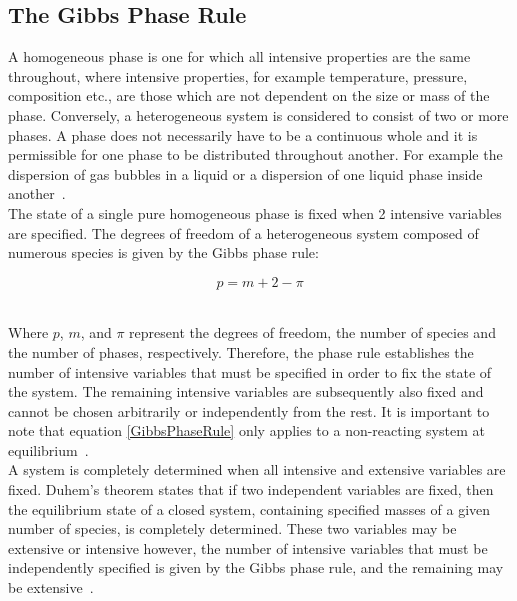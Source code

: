 \subsection{The Gibbs Phase Rule}

A homogeneous phase is one for which all intensive properties are the same throughout, where intensive properties, for example temperature, pressure, composition etc.,  are those which are not dependent on the size or mass of the phase. Conversely, a heterogeneous system is considered to consist of two or more phases. A phase does not necessarily have to be a continuous whole and it is permissible for one phase to be distributed throughout another. For example the dispersion of gas bubbles in a liquid or a dispersion of one liquid phase inside another~\cite{MolecularThermodynamicsOfFluidPhaseEquilibria, SmithNessAbbott}.\\

The state of a single pure homogeneous phase is fixed when 2 intensive variables are specified. The degrees of freedom of a heterogeneous system composed of numerous species is given by the Gibbs phase rule:\

\begin{equation}
p = m + 2 - \pi \label{GibbsPhaseRule}
\end{equation}\


Where $p$, $m$, and $\pi$ represent the degrees of freedom, the number of species and the number of phases, respectively. Therefore, the phase rule establishes the number of intensive variables that must be specified in order to fix the state of the system. The remaining intensive variables are subsequently also fixed and cannot be chosen arbitrarily or independently from the rest. It is important to note that equation \ref{GibbsPhaseRule} only applies to a non-reacting system at equilibrium~\cite{ SmithNessAbbott}. \\

A system is completely determined when all intensive and extensive variables are fixed. Duhem's theorem states that if two independent variables are fixed, then the equilibrium state of a closed system, containing specified masses of a given number of species, is completely determined. These two variables may be extensive or intensive however, the number of intensive variables that must be independently specified is given by the Gibbs phase rule, and the remaining may be extensive~\cite{ SmithNessAbbott}.\

